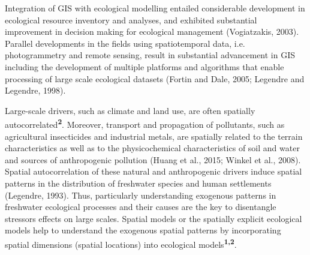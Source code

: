 {\begin{minipage}{\textwidth}
\begin{description}
Integration of GIS with ecological modelling entailed considerable development in ecological resource inventory and analyses, and exhibited substantial improvement in decision making for ecological management (Vogiatzakis, 2003). Parallel developments in the fields using spatiotemporal data, i.e. photogrammetry and remote sensing, result in substantial advancement in GIS including the development of multiple platforms and algorithms that enable processing of large scale ecological datasets (Fortin and Dale, 2005; Legendre and Legendre, 1998).

\end{description}

\end{minipage}}

\bigskip

Large-scale drivers, such as climate and land use, are often spatially autocorrelated\textsuperscript{\textbf{2}}. Moreover, transport and propagation of pollutants, such as agricultural insecticides and industrial metals, are spatially related to the terrain characteristics as well as to the physicochemical characteristics of soil and water and sources of anthropogenic pollution (Huang et al., 2015; Winkel et al., 2008). Spatial autocorrelation of these natural and anthropogenic drivers induce spatial patterns in the distribution of freshwater species and human settlements (Legendre, 1993). Thus, particularly understanding exogenous patterns in freshwater ecological processes and their causes are the key to disentangle stressors effects on large scales. Spatial models or the spatially explicit ecological models help to understand the exogenous spatial patterns by incorporating spatial dimensions (spatial locations) into ecological models\textsuperscript{\textbf{1,2}}.

\bigskip

